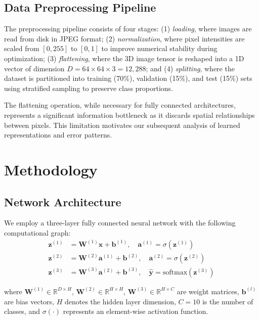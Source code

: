 \documentclass[sigconf,nonacm]{acmart}
\begin{document}
\subsection{Data Preprocessing Pipeline}

The preprocessing pipeline consists of four stages: (1) \textit{loading}, where images are read from disk in JPEG format; (2) \textit{normalization}, where pixel intensities are scaled from $[0, 255]$ to $[0, 1]$ to improve numerical stability during optimization; (3) \textit{flattening}, where the 3D image tensor is reshaped into a 1D vector of dimension $D = 64 \times 64 \times 3 = 12,288$; and (4) \textit{splitting}, where the dataset is partitioned into training (70\%), validation (15\%), and test (15\%) sets using stratified sampling to preserve class proportions.

The flattening operation, while necessary for fully connected architectures, represents a significant information bottleneck as it discards spatial relationships between pixels. This limitation motivates our subsequent analysis of learned representations and error patterns.

\section{Methodology}

\subsection{Network Architecture}

We employ a three-layer fully connected neural network with the following computational graph:
\begin{align}
\mathbf{z}^{(1)} &= \mathbf{W}^{(1)} \mathbf{x} + \mathbf{b}^{(1)}, \quad \mathbf{a}^{(1)} = \sigma(\mathbf{z}^{(1)}) \\
\mathbf{z}^{(2)} &= \mathbf{W}^{(2)} \mathbf{a}^{(1)} + \mathbf{b}^{(2)}, \quad \mathbf{a}^{(2)} = \sigma(\mathbf{z}^{(2)}) \\
\mathbf{z}^{(3)} &= \mathbf{W}^{(3)} \mathbf{a}^{(2)} + \mathbf{b}^{(3)}, \quad \hat{\mathbf{y}} = \text{softmax}(\mathbf{z}^{(3)})
\end{align}

where $\mathbf{W}^{(1)} \in \mathbb{R}^{D \times H}$, $\mathbf{W}^{(2)} \in \mathbb{R}^{H \times H}$, $\mathbf{W}^{(3)} \in \mathbb{R}^{H \times C}$ are weight matrices, $\mathbf{b}^{(l)}$ are bias vectors, $H$ denotes the hidden layer dimension, $C=10$ is the number of classes, and $\sigma(\cdot)$ represents an element-wise activation function.
\end{document}
